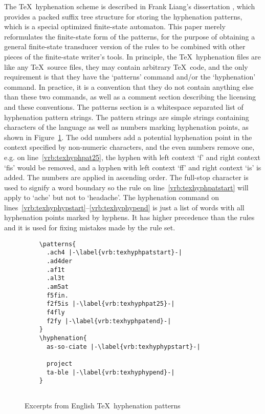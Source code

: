 \documentclass[a4paper,conference]{IEEEtran}
\begin{document}
The \TeX\ hyphenation scheme is described in Frank Liang's
dissertation \cite{liang/1983}, which provides a packed suffix tree
structure for storing the hyphenation patterns, which is a special
optimized finite-state automaton.  This paper merely reformulates the
finite-state form of the patterns, for the purpose of obtaining a
general finite-state transducer version of the rules to be combined
with other pieces of the finite-state writer's tools.  In principle,
the \TeX\ hyphenation files are like any \TeX\ source files, they may
contain arbitrary \TeX\ code, and the only requirement is that they
have the `patterns' command and/or the `hyphenation' command. In
practice, it is a convention that they do not contain anything else
than these two commands, as well as a comment section describing the
licensing and these conventions. The patterns section is a whitespace
separated list of hyphenation pattern strings. The pattern strings are
simple strings containing characters of the language as well as
numbers marking hyphenation points, as shown in
Figure~\ref{fig:tex-hyph-example}. The odd numbers add a potential
hyphenation point in the context specified by non-numeric characters,
and the even numbers remove one, e.g. on line~\ref{vrb:texhyphpat25},
the hyphen with left context `f' and right context `fis' would be
removed, and a hyphen with left context `ff' and right context `is' is
added. The numbers are applied in ascending order.  The full-stop
character is used to signify a word boundary so the rule on
line~\ref{vrb:texhyphpatstart} will apply to `ache' but not to
`headache'. The hyphenation command on
lines~\ref{vrb:texhyphypstart}--\ref{vrb:texhyphypend} is just a list
of words with all hyphenation points marked by hyphens. It has higher
precedence than the rules and it is used for fixing mistakes made
by the rule set.

\begin{figure}[tbp]
  \centering
  \begin{lstlisting}
    \patterns{
      .ach4 |-\label{vrb:texhyphpatstart}-|
      .ad4der
      .af1t
      .al3t
      .am5at
      f5fin.
      f2f5is |-\label{vrb:texhyphpat25}-|
      f4fly
      f2fy |-\label{vrb:texhyphpatend}-|
    }
    \hyphenation{
      as-so-ciate |-\label{vrb:texhyphypstart}-|
      
      project
      ta-ble |-\label{vrb:texhyphypend}-|
    }
    
  \end{lstlisting}
  \caption{Excerpts from English \TeX\ hyphenation patterns}
  \label{fig:tex-hyph-example}
\end{figure}
\end{document}
